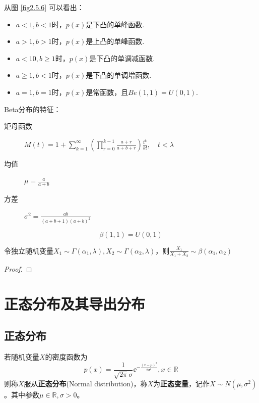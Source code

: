 从图 \ref{fig2.5.6} 可以看出：
\begin{itemize}
    \item $a<1,b<1$时，$p(x)$是下凸的单峰函数.
    \item $a>1,b>1$时，$p(x)$是上凸的单峰函数.
    \item $a<10,b\ge1$时，$p(x)$是下凸的单调减函数.
    \item $a\ge1,b<1$时，$p(x)$是下凸的单调增函数.
    \item $a=1,b=1$时，$p(x)$是常函数，且$Be(1,1)=U(0,1)$.
\end{itemize}

Beta分布的特征：
\begin{description}
    \item[矩母函数] $M(t)=1+\sum_{k=1}^{\infty}(\prod_{r=0}^{k-1} \frac{a+r}{a+b+r})\frac{t^k}{k!}, \quad t<\lambda$
    \item[均值] $\mu=\frac{a}{a+b}$
    \item[方差] $\sigma^2=\frac{ab}{(a+b+1)(a+b)^{2}}$
\end{description}

\begin{remark}
    \[ \beta(1,1)=U(0,1) \]
\end{remark}

\begin{proposition}
    令独立随机变量$X_1 \sim \Gamma(\alpha_1,\lambda),X_2 \sim  \Gamma(\alpha_2,\lambda)$，则$\frac{X_1}{X_1+X_2} \sim \beta(\alpha_1,\alpha_2)$
\end{proposition}

\begin{proof}
\end{proof}

\section{正态分布及其导出分布}

\subsection{正态分布}

\begin{definition}
    若随机变量$X$的密度函数为
    \begin{equation}\label{eq2.5.1}
        p(x) = \frac1{\sqrt{2\pi}\sigma} \ee^{-\frac{(x-\mu)^2}{2\sigma^2}},x \in \mathbb{R}
    \end{equation}
    则称$X$服从\textbf{正态分布}(Normal distribution)，称$X$为\textbf{正态变量}，记作$X\sim N(\mu,\sigma^2)$。其中参数$\mu \in \mathbb{R},\sigma>0$。
\end{definition}

